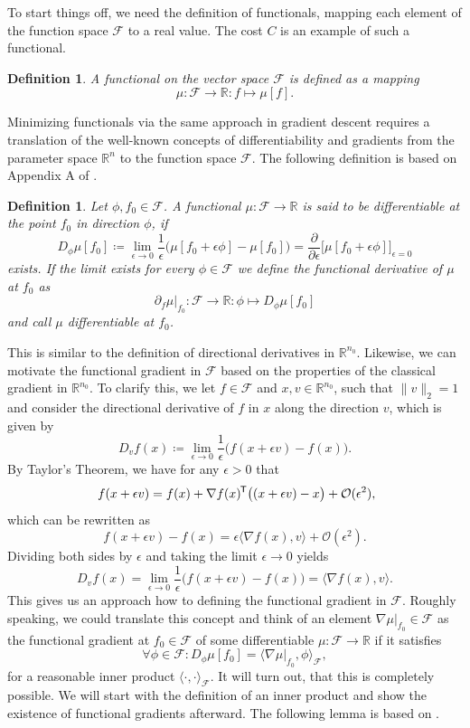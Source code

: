 \documentclass[11pt, a4paper]{article}
\newtheorem{definition}[theorem]{Definition}
\newcommand{\R}{\mathbb{R}}
\newcommand{\F}{\mathcal{F}}
\renewcommand{\O}{\mathcal{O}}
\newcommand*{\tr}{^{\mkern-1.5mu\mathsf{T}}}
\begin{document}
To start things off, we need the definition of functionals, mapping each element of the function space $\F$ to a real value. The cost $C$ is an example of such a functional.

\begin{definition}
A functional on the vector space $\F$ is defined as a mapping
\[ \mu: \F \to \R : f \mapsto \mu[f]. \]
\end{definition}

Minimizing functionals via the same approach in gradient descent requires a translation of the well-known concepts of differentiability and gradients from the parameter space $\R^n$ to the function space $\F$. The following definition is based on Appendix A of \cite{Functionals}.

\begin{definition}
Let $\phi, f_0 \in \F$. A functional $\mu : \F \to \R$ is said to be differentiable at the point $f_0$ in direction $\phi$, if
\[ D_\phi\mu[f_0] \coloneq \lim_{\epsilon \to 0} \frac{1}{\epsilon} \Big ( \mu[f_0 + \epsilon \phi] - \mu[f_0] \Big ) = \frac{\partial}{\partial \epsilon} \Big [ \mu[f_0+\epsilon \phi] \Big ]_{\epsilon=0} \]
exists. If the limit exists for every $\phi \in \F$ we define the functional derivative of $\mu$ at $f_0$ as
\[ \partial_{f} \mu |_{f_0} : \F \to \R : \phi \mapsto D_\phi\mu[f_0] \]
and call $\mu$ differentiable at $f_0$.
\end{definition}

This is similar to the definition of directional derivatives in $\R^{n_0}$. Likewise, we can motivate the functional gradient in $\F$ based on the properties of the classical gradient in $\R^{n_0}$. To clarify this, we let $f \in \F$ and $x,v \in \R^{n_0}$, such that $\| v \|_2 = 1$ and consider the directional derivative of $f$ in $x$ along the direction $v$, which is given by
\[ D_vf(x) \coloneq \lim_{\epsilon \to 0} \frac{1}{\epsilon} \Big ( f(x + \epsilon v) - f(x) \Big ). \]
By Taylor's Theorem, we have for any $\epsilon > 0$ that 
\[ f(x+\epsilon v) = f(x) + \nabla f(x) \tr \big ((x + \epsilon v) - x \big ) + \O(\epsilon^2), \]
which can be rewritten as
\[ f(x + \epsilon v ) - f(x) = \epsilon \big \langle \nabla f(x), v \big \rangle + \O (\epsilon^2). \]
Dividing both sides by $\epsilon$ and taking the limit $\epsilon \to 0$ yields
\[ D_vf(x) =  \lim_{\epsilon \to 0} \frac{1}{\epsilon} \Big ( f(x + \epsilon v) - f(x) \Big ) = \big \langle \nabla f(x), v \big \rangle. \]
This gives us an approach how to defining the functional gradient in $\F$. Roughly speaking, we could translate this concept and think of an element $\nabla \mu |_{f_0} \in \F $ as the functional gradient at $f_0 \in \F$ of some differentiable $\mu: \F \to \R$ if it satisfies
\[ \forall \phi \in \F : D_\phi\mu[f_0] = \big \langle \nabla \mu |_{f_0}, \phi \big \rangle_\F, \]
for a reasonable inner product $\langle \cdot, \cdot \rangle_\F$. It will turn out, that this is completely possible. We will start with the definition of an inner product and show the existence of functional gradients afterward. The following lemma is based on \cite{NTK}.
\end{document}
